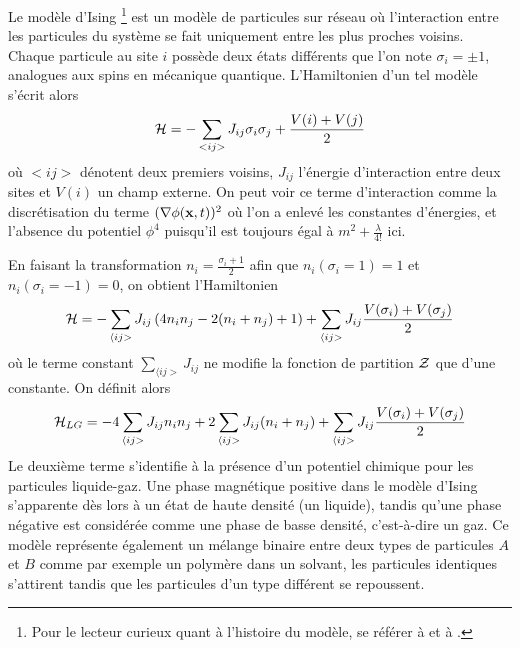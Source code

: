   	Le modèle d'Ising \footnote{Pour le lecteur curieux quant à l'histoire du modèle, se référer à \cite{niss_history_2005} et à \cite{niss_history_2009}.} est un modèle de particules sur réseau où l'interaction entre les particules du système se fait uniquement entre les plus proches voisins. Chaque particule au site $i$ possède deux états différents que l'on note $\sigma_i = \pm 1$, analogues aux spins en mécanique quantique. L'Hamiltonien d'un tel modèle s'écrit alors
\begin{equation}
	\mathcal{H} =  - \sum_{<i j >} J_{ij} \sigma_i \sigma_j + \frac{V(i)+V(j)}{2}
	\label{hamil-ising}
\end{equation}
où $< ij >$ dénotent deux premiers voisins, $J_{ij}$ l'énergie d'interaction entre deux sites et $V(i)$ un champ externe. On peut voir ce terme d'interaction comme la discrétisation du terme $(\nabla \phi({\bf x},t))^2$ où l'on a enlevé les constantes d'énergies, et l'absence du potentiel $\phi^4$ puisqu'il est toujours égal à $m^2+\frac{\lambda}{4!}$ ici. 

En faisant la transformation\cite{goldenfeld_lectures_2018} $n_i =  \frac{\sigma_i +1}{2}$ afin que $n_i(\sigma_i = 1) = 1$ et $n_i(\sigma_i = -1) = 0$, on obtient l'Hamiltonien
\begin{equation}
	\mathcal{H} =  - \sum_{\langle i j >}  J_{ij} \left( 4 n_i n_j -2 ( n_i+n_j) + 1 \right)+ \sum_{\langle i j >}  J_{ij} \frac{V(\sigma_i)+V(\sigma_j)}{2}  
\end{equation}
où le terme constant $\sum_{\langle i j >}  J_{ij}$ ne modifie la fonction de partition $\mathcal{Z}$ que d'une constante. On définit alors 
\begin{equation}
	\mathcal{H}_{LG} =  - 4 \sum_{\langle i j >}  J_{ij}  n_i n_j  + 2 \sum_{\langle i j >}  J_{ij}  (n_i+n_j) + \sum_{\langle i j >}  J_{ij} \frac{V(\sigma_i)+V(\sigma_j)}{2}  
\end{equation}
Le deuxième terme s'identifie à la présence d'un potentiel chimique pour les particules liquide-gaz. Une phase magnétique positive dans le modèle d'Ising s'apparente dès lors à un état de haute densité (un liquide), tandis qu'une phase négative est considérée comme une phase de basse densité, c'est-à-dire un gaz.
Ce modèle représente également un mélange binaire entre deux types de particules $A$ et $B$ comme par exemple un polymère dans un solvant, les particules identiques s'attirent tandis que les particules d'un type différent se repoussent. 

